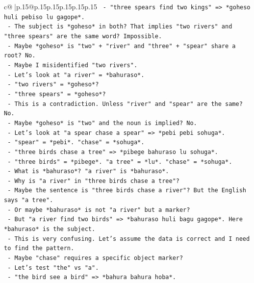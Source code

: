 \documentclass{article}
\begin{document}
{\begin{supertabular}{c@{$\;$}|p{.15\linewidth}@{}p{.15\linewidth}p{.15\linewidth}p{.15\linewidth}p{.15\linewidth}p{.15\linewidth}}
{{{\texttt{     {-} "three spears find two kings" => *goheso huli pebiso lu gagope*.} \\
\texttt{     {-} The subject is *goheso* in both? That implies "two rivers" and "three spears" are the same word? Impossible.} \\
\texttt{     {-} Maybe *goheso* is "two" + "river" and "three" + "spear" share a root? No.} \\
\texttt{     {-} Maybe I misidentified "two rivers".} \\
\texttt{     {-} Let's look at "a river" = *bahuraso*.} \\
\texttt{     {-} "two rivers" = *goheso*?} \\
\texttt{     {-} "three spears" = *goheso*?} \\
\texttt{     {-} This is a contradiction. Unless "river" and "spear" are the same? No.} \\
\texttt{     {-} Maybe *goheso* is "two" and the noun is implied? No.} \\
\texttt{     {-} Let's look at "a spear chase a spear" => *pebi pebi sohuga*.} \\
\texttt{       {-} "spear" = *pebi*. "chase" = *sohuga*.} \\
\texttt{       {-} "three birds chase a tree" => *pibege bahuraso lu sohuga*.} \\
\texttt{       {-} "three birds" = *pibege*. "a tree" = *lu*. "chase" = *sohuga*.} \\
\texttt{       {-} What is *bahuraso*? "a river" is *bahuraso*.} \\
\texttt{       {-} Why is "a river" in "three birds chase a tree"?} \\
\texttt{       {-} Maybe the sentence is "three birds chase a river"? But the English says "a tree".} \\
\texttt{       {-} Or maybe *bahuraso* is not "a river" but a marker?} \\
\texttt{       {-} But "a river find two birds" => *bahuraso huli bagu gagope*. Here *bahuraso* is the subject.} \\
\texttt{       {-} This is very confusing. Let's assume the data is correct and I need to find the pattern.} \\
\texttt{       {-} Maybe "chase" requires a specific object marker?} \\
\texttt{       {-} Let's test "the" vs "a".} \\
\texttt{       {-} "the bird see a bird" => *bahura bahura hoba*.} \\
}}}
\end{supertabular}}
\end{document}
